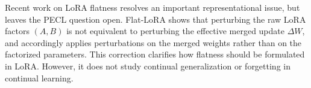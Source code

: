 \documentclass[10pt]{article} %
\begin{document}




Recent work on LoRA flatness resolves an important representational issue, but leaves the PECL question open. Flat-LoRA\cite{li2024flatlora} shows that perturbing the raw LoRA factors $(A,B)$ is not equivalent to perturbing the effective merged update $\Delta W$, and accordingly applies perturbations on the merged weights rather than on the factorized parameters. This correction clarifies how flatness should be formulated in LoRA. However, it does not study continual generalization or forgetting in continual learning. 

\end{document}
